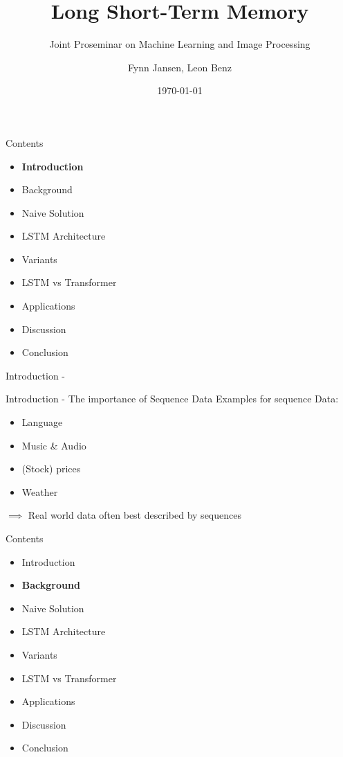 \documentclass[10pt, aspectratio=169]{beamer}
\title{Long Short-Term Memory}
\subtitle{Joint Proseminar on Machine Learning and Image Processing}
\date{\today}
\author{Fynn Jansen, Leon Benz}
\institute{Chair of Computer Science 13 (Computer Vision)\\RWTH Aachen}
\begin{document}
\maketitle


\begin{frame}[t]{Contents}
\begin{itemize}
    \item \textbf{Introduction}
    \item Background
    \item Naive Solution
    \item LSTM Architecture
    \item Variants
    \item LSTM vs Transformer
    \item Applications
    \item Discussion
    \item Conclusion
\end{itemize}
\end{frame}

\begin{frame}{Introduction - }
    
\end{frame}

\begin{frame}[t]{Introduction - The importance of Sequence Data}
Examples for sequence Data: \pause
\begin{itemize}
    \item Language \pause
    \item Music \& Audio \pause
    \item (Stock) prices \pause
    \item Weather \pause
\end{itemize}
\begin{math}\implies\end{math} Real world data often best described by sequences
\end{frame}

\begin{frame}[t]{Contents}
\begin{itemize}
    \item Introduction
    \item \textbf{Background}
    \item Naive Solution
    \item LSTM Architecture
    \item Variants
    \item LSTM vs Transformer
    \item Applications
    \item Discussion
    \item Conclusion
\end{itemize}
\end{frame}
\end{document}
